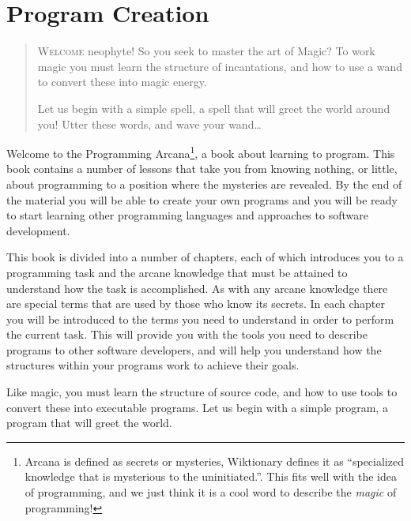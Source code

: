 
\chapter{Program Creation} %
\label{cha:programCreation}

\begin{quote}
  \Fontlukas\Large
  \renewcommand{\LettrineTextFont}{\relax}
  \renewcommand{\LettrineFontHook}{\color{red}}
  \lettrine[image=true,lines=3,lhang=.2, loversize=.25, findent=0.1em]
  {W}{elcome} neophyte! So you seek to master the art of Magic? To work magic you must learn the structure of incantations, and how to use a wand to convert these into magic energy. 
  
  Let us begin with a simple spell, a spell that will greet the world around you! Utter these words, and wave your wand\ldots
\end{quote}

\bigskip

Welcome to the Programming Arcana\footnote{Arcana is defined as secrets or mysteries, Wiktionary defines it as ``specialized knowledge that is mysterious to the uninitiated.''. This fits well with the idea of programming, and we just think it is a cool word to describe the \emph{magic} of programming!}, a book about learning to program. This book contains a number of lessons that take you from knowing nothing, or little, about programming to a position where the mysteries are revealed. By the end of the material you will be able to create your own programs and you will be ready to start learning other programming languages and approaches to software development.

This book is divided into a number of chapters, each of which introduces you to a programming task and the arcane knowledge that must be attained to understand how the task is accomplished. As with any arcane knowledge there are special terms that are used by those who know its secrets. In each chapter you will be introduced to the terms you need to understand in order to perform the current task. This will provide you with the tools you need to describe programs to other software developers, and will help you understand how the structures within your programs work to achieve their goals.

Like magic, you must learn the structure of source code, and how to use tools to convert these into executable programs. Let us begin with a simple program, a program that will greet the world.

\clearpage






